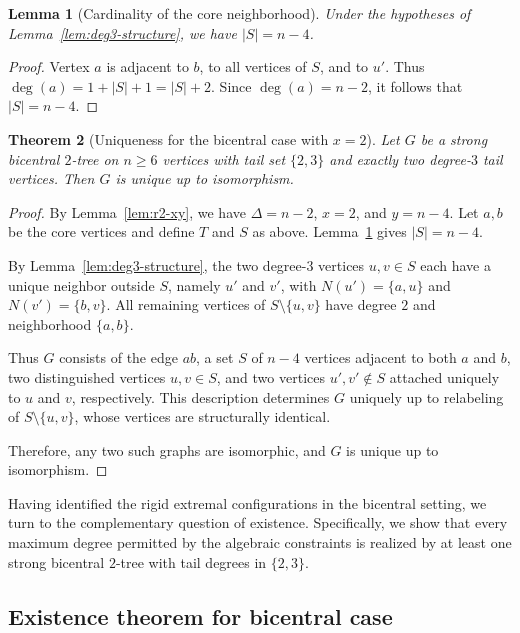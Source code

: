 \documentclass[12pt]{article}
\newtheorem{theorem}{Theorem}[section]
\newtheorem{lemma}[theorem]{Lemma}
\numberwithin{equation}{section}
\begin{document}
\begin{lemma}[Cardinality of the core neighborhood]
\label{lem:S-size}
Under the hypotheses of Lemma~\ref{lem:deg3-structure}, we have $|S|=n-4$.
\end{lemma}

\begin{proof}
Vertex $a$ is adjacent to $b$, to all vertices of $S$, and to $u'$.
Thus $\deg(a)=1+|S|+1=|S|+2$.
Since $\deg(a)=n-2$, it follows that $|S|=n-4$.
\end{proof}


\begin{theorem}[Uniqueness for the bicentral case with $x=2$]
\label{thm:x2-unique}
Let $G$ be a strong bicentral $2$-tree on $n\ge 6$ vertices with tail set $\{2,3\}$
and exactly two degree-$3$ tail vertices.
Then $G$ is unique up to isomorphism.
\end{theorem}

\begin{proof}
By Lemma~\ref{lem:r2-xy}, we have $\Delta=n-2$, $x=2$, and $y=n-4$.
Let $a,b$ be the core vertices and define $T$ and $S$ as above.
Lemma~\ref{lem:S-size} gives $|S|=n-4$.

By Lemma~\ref{lem:deg3-structure}, the two degree-$3$ vertices $u,v\in S$ each have
a unique neighbor outside $S$, namely $u'$ and $v'$, with
$N(u')=\{a,u\}$ and $N(v')=\{b,v\}$.
All remaining vertices of $S\setminus\{u,v\}$ have degree $2$ and neighborhood
$\{a,b\}$.

Thus $G$ consists of the edge $ab$, a set $S$ of $n-4$ vertices adjacent to both
$a$ and $b$, two distinguished vertices $u,v\in S$, and two vertices
$u',v'\notin S$ attached uniquely to $u$ and $v$, respectively.
This description determines $G$ uniquely up to relabeling of
$S\setminus\{u,v\}$, whose vertices are structurally identical.

Therefore, any two such graphs are isomorphic, and $G$ is unique up to isomorphism.
\end{proof}

Having identified the rigid extremal configurations in the bicentral setting, we turn to the complementary question of existence.
Specifically, we show that every maximum degree permitted by the algebraic constraints is realized by at least one strong bicentral $2$-tree with tail degrees in $\{2,3\}$.

\subsection{Existence theorem for bicentral case}
\end{document}
